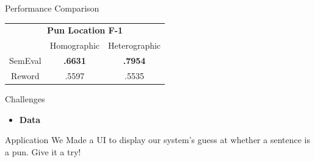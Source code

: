 \documentclass[final]{beamer}
\newlength{\onecolwid}
\begin{document}
\begin{frame}[t]
\begin{columns}[t]
\begin{column}{\onecolwid}
\begin{block}{Performance Comparison}
\begin{center}
				\end{center}
				\vspace{10mm}
				\begin{center}
					\begin{tabular}{ c|c|c } 
						\multicolumn{3}{c}{\textbf{Pun Location F-1}}\\
						 & Homographic & Heterographic \\ 
						\hline
						SemEval & \textbf{.6631} & \textbf{.7954} \\ 
						\hline
						Reword & .5597 & .5535 \\ 
					\end{tabular}
				\end{center}
            \end{block}
            \vspace{20mm}
            \begin{block}{Challenges}
				\large{
					\begin{itemize}
						\item {\textbf{Data}\\
						}
					\end{itemize}

				}
            \end{block}
            \vspace{20mm}
			\begin{block}{Application}
				\large{
					We Made a UI to display our system's guess at whether a sentence is a pun. Give it a try!
				}
				\vspace{20mm}


\end{block}
\end{column}
\end{columns}
\end{frame}
\end{document}
